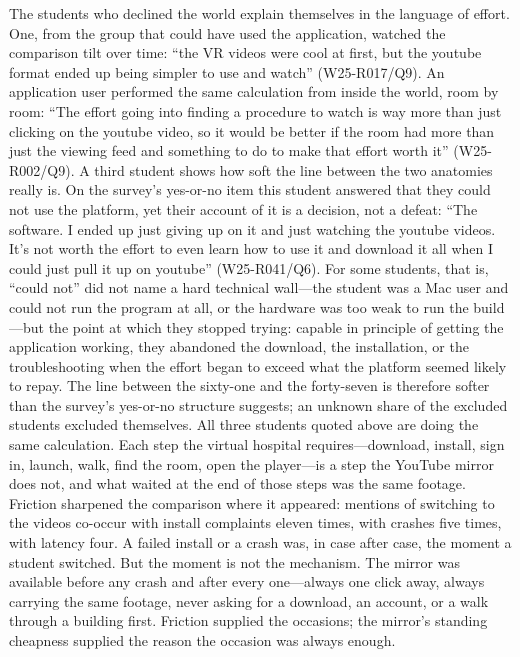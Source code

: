 The students who declined the world explain themselves in the language of
effort. One, from the group that could have used the application, watched
the comparison tilt over time: ``the VR videos were cool at first, but the
youtube format ended up being simpler to use and watch'' (W25-R017/Q9). An
application user performed the same calculation from inside the world,
room by room: ``The effort going into finding a procedure to watch is way
more than just clicking on the youtube video, so it would be better if the
room had more than just the viewing feed and something to do to make that
effort worth it'' (W25-R002/Q9). A third student shows how soft the line
between the two anatomies really is. On the survey's yes-or-no item this
student answered that they could not use the platform, yet their account of
it is a decision, not a defeat: ``The software. I ended up just giving up
on it and just watching the youtube videos. It's not worth the effort to
even learn how to use it and download it all when I could just pull it up
on youtube'' (W25-R041/Q6). For some students, that is, ``could not'' did
not name a hard technical wall---the student was a Mac user and could not
run the program at all, or the hardware was too weak to run the build---but
the point at which they stopped trying: capable in principle of getting the application working, they
abandoned the download, the installation, or the troubleshooting when the
effort began to exceed what the platform seemed likely to repay. The line
between the sixty-one and the forty-seven is therefore softer than the
survey's yes-or-no structure suggests; an unknown share of the excluded students
excluded themselves. All three students quoted above are doing the same
calculation. Each step the virtual hospital requires---download, install,
sign in, launch, walk, find the room, open the player---is a step the
YouTube mirror does not, and what waited at the end of those steps was the
same footage. Friction sharpened the comparison where it appeared: mentions
of switching to the videos co-occur with install complaints eleven times,
with crashes five times, with latency four. A failed install or a crash
was, in case after case, the moment a student switched. But the moment is
not the mechanism. The mirror was available before any crash and after
every one---always one click away, always carrying the same footage, never
asking for a download, an account, or a walk through a building first.
Friction supplied the occasions; the mirror's standing cheapness supplied
the reason the occasion was always enough.

